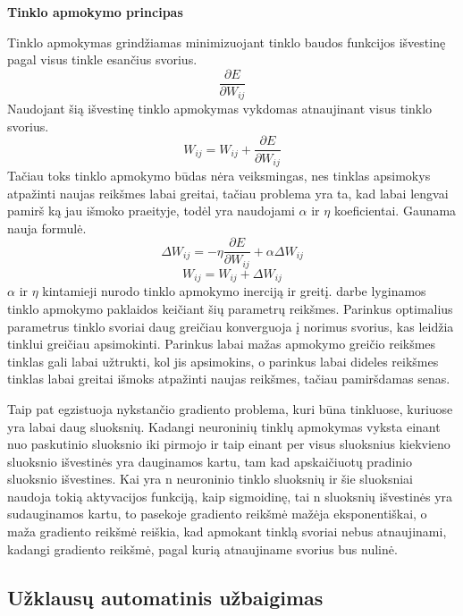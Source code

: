 \textbf{Tinklo apmokymo principas}

Tinklo apmokymas grindžiamas minimizuojant tinklo baudos funkcijos išvestinę pagal visus tinkle esančius svorius.
    \begin{equation*}
      \frac{\partial E}{\partial W_{ij}}
    \end{equation*}
Naudojant šią išvestinę tinklo apmokymas vykdomas atnaujinant visus tinklo svorius.
    \begin{equation*}
      W_{ij} = W_{ij} + \frac{\partial E}{\partial W_{ij}}
    \end{equation*}
Tačiau toks tinklo apmokymo būdas nėra veiksmingas, nes tinklas apsimokys atpažinti naujas reikšmes labai greitai, tačiau problema yra ta, kad labai lengvai pamirš ką jau išmoko praeityje, todėl yra naudojami $\alpha$ ir $\eta$ koeficientai. Gaunama nauja formulė.
\begin{equation*}
  \Delta W_{ij} =-\eta\frac{\partial E}{\partial W_{ij}}+\alpha \Delta W_{ij}
\end{equation*}
\begin{equation*}
    W_{ij} = W_{ij} + \Delta W_{ij}
\end{equation*}
$\alpha$ ir $\eta$ kintamieji nurodo tinklo apmokymo inerciją ir greitį. \cite{Deividas2018} darbe lyginamos tinklo apmokymo paklaidos keičiant šių parametrų reikšmes. Parinkus optimalius parametrus tinklo svoriai daug greičiau konverguoja į norimus svorius, kas leidžia tinklui greičiau apsimokinti. Parinkus labai mažas apmokymo greičio reikšmes tinklas gali labai užtrukti, kol jis apsimokins, o parinkus labai dideles reikšmes tinklas labai greitai išmoks atpažinti naujas reikšmes, tačiau pamiršdamas senas.

Taip pat egzistuoja nykstančio gradiento problema, kuri būna tinkluose, kuriuose yra labai daug sluoksnių. Kadangi neuroninių tinklų apmokymas vyksta einant nuo paskutinio sluoksnio iki pirmojo ir taip einant per visus sluoksnius kiekvieno sluoksnio išvestinės yra dauginamos kartu, tam kad apskaičiuotų pradinio sluoksnio išvestines. Kai yra n neuroninio tinklo sluoksnių ir šie sluoksniai naudoja tokią aktyvacijos funkciją, kaip sigmoidinę, tai n sluoksnių išvestinės yra sudauginamos kartu, to pasekoje gradiento reikšmė mažėja eksponentiškai, o maža gradiento reikšmė reiškia, kad apmokant tinklą svoriai nebus atnaujinami, kadangi gradiento reikšmė, pagal kurią atnaujiname svorius bus nulinė.\cite{Wang2019} \cite{Shepherd1997}

\subsection{Užklausų automatinis užbaigimas}

